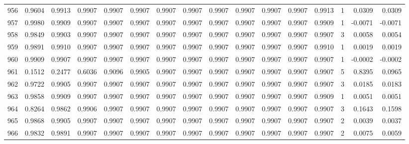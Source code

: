 \begin{tabular}{lrrrrrrrrrrrrrrr}
956 &      0.9604 &  0.9913 &  0.9907 &  0.9907 &  0.9907 &  0.9907 &  0.9907 &  0.9907 &  0.9907 &  0.9907 &   0.9907 &     0.9913 &      1 &                    0.0309 &                     0.0309 \\
957 &      0.9980 &  0.9909 &  0.9907 &  0.9907 &  0.9907 &  0.9907 &  0.9907 &  0.9907 &  0.9907 &  0.9907 &   0.9907 &     0.9909 &      1 &                   -0.0071 &                    -0.0071 \\
958 &      0.9849 &  0.9903 &  0.9907 &  0.9907 &  0.9907 &  0.9907 &  0.9907 &  0.9907 &  0.9907 &  0.9907 &   0.9907 &     0.9907 &      3 &                    0.0058 &                     0.0054 \\
959 &      0.9891 &  0.9910 &  0.9907 &  0.9907 &  0.9907 &  0.9907 &  0.9907 &  0.9907 &  0.9907 &  0.9907 &   0.9907 &     0.9910 &      1 &                    0.0019 &                     0.0019 \\
960 &      0.9909 &  0.9907 &  0.9907 &  0.9907 &  0.9907 &  0.9907 &  0.9907 &  0.9907 &  0.9907 &  0.9907 &   0.9907 &     0.9907 &      1 &                   -0.0002 &                    -0.0002 \\
961 &      0.1512 &  0.2477 &  0.6036 &  0.9096 &  0.9905 &  0.9907 &  0.9907 &  0.9907 &  0.9907 &  0.9907 &   0.9907 &     0.9907 &      5 &                    0.8395 &                     0.0965 \\
962 &      0.9722 &  0.9905 &  0.9907 &  0.9907 &  0.9907 &  0.9907 &  0.9907 &  0.9907 &  0.9907 &  0.9907 &   0.9907 &     0.9907 &      3 &                    0.0185 &                     0.0183 \\
963 &      0.9858 &  0.9909 &  0.9907 &  0.9907 &  0.9907 &  0.9907 &  0.9907 &  0.9907 &  0.9907 &  0.9907 &   0.9907 &     0.9909 &      1 &                    0.0051 &                     0.0051 \\
964 &      0.8264 &  0.9862 &  0.9906 &  0.9907 &  0.9907 &  0.9907 &  0.9907 &  0.9907 &  0.9907 &  0.9907 &   0.9907 &     0.9907 &      3 &                    0.1643 &                     0.1598 \\
965 &      0.9868 &  0.9905 &  0.9907 &  0.9907 &  0.9907 &  0.9907 &  0.9907 &  0.9907 &  0.9907 &  0.9907 &   0.9907 &     0.9907 &      2 &                    0.0039 &                     0.0037 \\
966 &      0.9832 &  0.9891 &  0.9907 &  0.9907 &  0.9907 &  0.9907 &  0.9907 &  0.9907 &  0.9907 &  0.9907 &   0.9907 &     0.9907 &      2 &                    0.0075 &                     0.0059 \\

\end{tabular}

